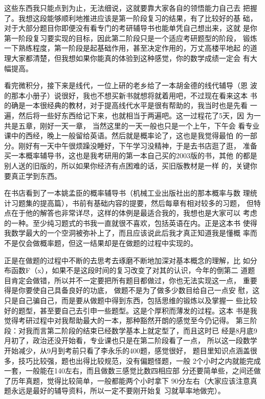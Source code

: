 \documentclass[11pt,twoside,openany,x11names,svgnames]{memoir}
\begin{document}
这些东西我只能点到为止，无法细说，这就要靠大家各自的领悟能力自己去
把握了。我想这段能够顺利地推进应该是第一阶段复习的结果，有了比较好的基
础，对于大部分题目你即便没有看专门的考研辅导书也能单凭自己想出来，这就
是你第一阶段复习要实现的目标，因此第二阶段只是一个适应考研题型的阶段，
锻炼一下熟练程度，第一阶段是起基础作用，甚至决定作用的，万丈高楼平地起
的道理大家都清楚，但我想如果你能真的体验到这种感觉，你的数学成绩一定会
有大幅提高。

看完微积分，接下来是线代，一位上研的老乡给了一本胡金德的线代辅导（恩
波的那本小册子）说很好，我也不想买新书就想将就着用吧，不过现在看来这本
书的确是一本很经典的教材，对于提高线代水平是很有帮助的，我当时也是先看
一遍，然后将一些好东西给记下来，也就相当于两遍吧。这一过程花了5天，因
为一共是五章，刚好一天一章， 当然这里的一天一般也只是一个上午，下午会
看专业课中的西经，晚上一般留给英语。然后就是概率论了，这也是我觉得最怕
的一部分。刚好有一天中午很烦躁没睡好，下午学习没精神，于是去书店逛了逛，
准备买一本概率辅导书，这也是我考研用的第一本自己买的2003版的书，其他
的都是别人送的旧版的，所以如果你经济有点困难的话，买旧版教材是一样
的，关键你要真正学到东西。

在书店看到了一本姚孟臣的概率辅导书（机械工业出版社出的那本概率与数
理统计习题集的提高篇），书前有基础内容的提要，然后每章有相对较多的习题，
但特点在于他的解答也非常详尽，这样的体例是最适合我的，我想也是大家可以
考虑的一种。至少纯习题式的书我一直就很不喜欢，包括英语在内。正是这本书
使得我数学最大的一个空洞被弥补上了，而且应该说此后我才真正知道我是懂概
率而不是仅会做概率题，但这一结果却是在做题的过程中实现的。

正是在做题的过程中不断的去思考去琢磨不断地加深对基本概念的理解，比
如分布函数F（x），如果不是这段时间的复习改变了对其的认识，今年的倒第二
道题目肯定会做错，所以并不一定要把所有题目都做过，你也无法实现这一点，
重要得是你要使自己具备良好的功底， 做题不是为了做多少数目给自己一点安
慰，这只是自己骗自己，而是要从做题中得到东西，包括思维的锻炼以及掌握一
些比较好的题型，甚至要自己去引申一些题型。这是个厚积而薄发的过程。这本
书是我觉得考研过程中对我帮助最大的一本，那种豁然开朗的感觉至今仍记得。
第三阶段：对我而言第二阶段的结束已经数学基本上就定型了，而且这时已
经是8月底9月初了，政治还没开始看，专业课也只是在第二阶段看了一点，
所以这一段数学开始减少，从9月到考前只看了李永乐的400题，感觉很好，
题目里知识点涵盖很多，技巧比较强，题也出得比较规范，没有偏题怪题，一般
2个小时之内就能完成一套，一般能在140左右，而且做数三感觉比数四相应部
分还要简单些，之间还做了历年真题，觉得比较简单，一般都能两个小时拿下
90分左右（大家应该注意真题永远是最好的辅导资料，所以一定不要刚开始复
习就草率地做完）。
\end{document}

